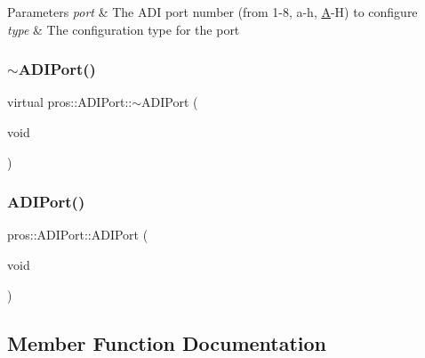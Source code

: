 \begin{DoxyParams}{Parameters}
{\em port} & The A\+DI port number (from 1-\/8, \textquotesingle{}a\textquotesingle{}-\/\textquotesingle{}h\textquotesingle{}, \textquotesingle{}\mbox{\hyperlink{structA}{A}}\textquotesingle{}-\/\textquotesingle{}H\textquotesingle{}) to configure \\
\hline
{\em type} & The configuration type for the port \\
\hline
\end{DoxyParams}
\mbox{\label{classpros_1_1ADIPort_ab100339f40f975055431cc8a5aed310a}} 
\subsubsection{\texorpdfstring{$\sim$ADIPort()}{~ADIPort()}}
{\footnotesize\ttfamily virtual pros\+::\+A\+D\+I\+Port\+::$\sim$\+A\+D\+I\+Port (\begin{DoxyParamCaption}\item[{void}]{ }\end{DoxyParamCaption})\hspace{0.3cm}{\ttfamily [virtual]}}

\mbox{\label{classpros_1_1ADIPort_a7f44b44ce0528ea4c5ef83ed8465e72d}} 
\subsubsection{\texorpdfstring{ADIPort()}{ADIPort()}\hspace{0.1cm}{\footnotesize\ttfamily [2/2]}}
{\footnotesize\ttfamily pros\+::\+A\+D\+I\+Port\+::\+A\+D\+I\+Port (\begin{DoxyParamCaption}\item[{void}]{ }\end{DoxyParamCaption})\hspace{0.3cm}{\ttfamily [protected]}}



\subsection{Member Function Documentation}
\mbox{\label{classpros_1_1ADIPort_a1227bc815b12d2789cb78f6d3dcaf37b}} 

